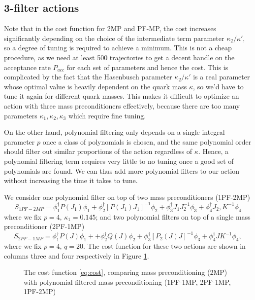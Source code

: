 \subsection{3-filter actions}
Note that in the cost function for 2MP and PF-MP, the cost increases significantly depending on the choice of the intermediate term parameter $\kappa_2 / \kappa'$, so a degree of tuning is required to achieve a minimum.
This is not a cheap procedure, as we need at least 500 trajectories to get a decent handle on the acceptance rate $P_{acc}$ for each set of parameters and hence the cost.
This is complicated by the fact that the Hasenbusch parameter $\kappa_2 / \kappa'$ is a real parameter whose optimal value is heavily dependent on the quark mass $\kappa$, so we'd have to tune it again for different quark masses.
This makes it difficult to optimize an action with three mass preconditioners effectively, because there are too many parameters $\kappa_1, \kappa_2, \kappa_3$ which require fine tuning.

On the other hand, polynomial filtering only depends on a single integral parameter $p$ once a class of polynomials is chosen, and the same polynomial order should filter out similar proportions of the action regardless of $\kappa$.
Hence, a polynomial filtering term requires very little to no tuning once a good set of polynomials are found.
We can thus add more polynomial filters to our action without increasing the time it takes to tune.

We consider one polynomial filter on top of two mass preconditioners (1PF-2MP)
\begin{equation}
	S_{1PF-2MP} = \phi_1^\dag P(J_1) \phi_1 + \phi_2^\dag [P(J_1) J_1]^{-1} \phi_2 + \phi_3^\dag J_1 J_2^{-1} \phi_3 + \phi_4^\dag J_2, K^{-1} \phi_4
\end{equation}
where we fix $p=4$, $\kappa_1 = 0.145$; and two polynomial filters on top of a single mass preconditioner (2PF-1MP)
\begin{equation}
	S_{2PF-1MP} = \phi_1^\dag P(J) \phi_1 + + \phi_2^\dag Q(J) \phi_2 + \phi_3^\dag [P_2(J) J]^{-1} \phi_3 + \phi_4^\dag J K^{-1} \phi_4,
\end{equation}
where we fix $p=4$, $q=20$.
The cost function for these two actions are shown in columns three and four respectively in Figure \ref{fig:pfmp_cost}.

\begin{figure}
\centering

\caption{The cost function \eqref{eq:cost}, comparing mass preconditioning (2MP) with polynomial filtered mass preconditioning (1PF-1MP, 2PF-1MP, 1PF-2MP)} \label{fig:pfmp_cost}
\end{figure}

